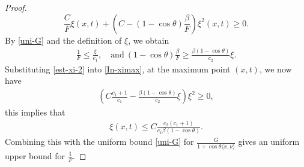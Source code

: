 \documentclass[10pt,a4paper]{amsart}
\begin{document}
\begin{proof}
\begin{equation}\label{In-ximax}
 \frac{C}{F}\xi(x,t)+(C-(1-\cos\theta)\frac{\beta}{F})\xi^2(x,t)\geq0.
\end{equation}
By \eqref{uni-G} and the definition of $\xi$, we obtain
\begin{align}\label{est-xi-2}
\frac{1}{F}\leq\frac{\xi}{c_1}, \quad \text{and}\ 	(1-\cos\theta)\frac{\beta}{F}\geq\frac{\beta(1-\cos\theta)}{c_2}\xi.
\end{align}
Substituting \eqref{est-xi-2} into \eqref{In-ximax}, at the maximum point $(x,t)$, we now have
\begin{align}
	\left(C\frac{c_1+1}{c_1}-\frac{\beta(1-\cos\theta)}{c_2}\xi\right)\xi^2\geq0,
\end{align}
this implies that 
\begin{align*}
	\xi(x,t)\leq C\frac{c_2(c_1+1)}{c_1\beta(1-\cos\theta)}.
\end{align*}
	Combining this with the uniform bound \eqref{uni-G} for $\frac{G}{1+\cos\theta\langle x,\nu\rangle}$ gives an uniform upper bound for $\frac{1}{F}$.


%
%

\end{proof}
\end{document}
